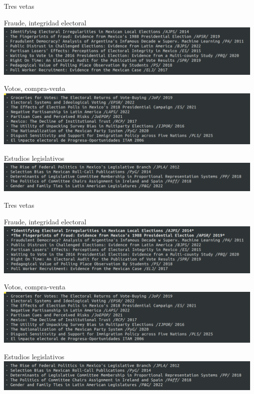 \documentclass[bigger]{beamer}
\begin{document}
\begin{frame}[label={sec:orgfc0634f}]{Tres vetas}
\begin{block}{Fraude, integridad electoral}
\includegraphics[width=\textwidth]{./pics/pubs1.png}
\end{block}
\begin{block}{Votos, compra-venta}
\includegraphics[width=\textwidth]{./pics/pubs2.png}
\end{block}
\begin{block}{Estudios legislativos}
\includegraphics[width=\textwidth]{./pics/pubs3.png}
\end{block}
\end{frame}
\begin{frame}[label={sec:org5ce83c4}]{Tres vetas}
\begin{block}{Fraude, integridad electoral}
\includegraphics[width=\textwidth]{./pics/pubs1s.png}
\end{block}
\begin{block}{Votos, compra-venta}
\includegraphics[width=\textwidth]{./pics/pubs2.png}
\end{block}
\begin{block}{Estudios legislativos}
\includegraphics[width=\textwidth]{./pics/pubs3.png}
\end{block}
\end{frame}
\end{document}
